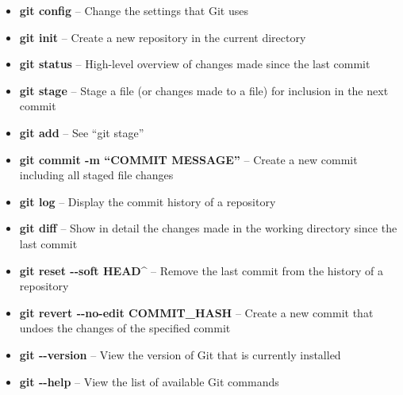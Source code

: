 \documentclass[9pt]{extarticle}
\def\itempad{-1pt}
\begin{document}
\begin{navybox}[title=Git Command Cheat Sheet]
  \begin{itemize}
    \itemsep\itempad
  \item \textbf{git config} -- Change the settings that Git uses
  \item \textbf{git init} -- Create a new repository in the current directory
  \item \textbf{git status} -- High-level overview of changes made since the last
    commit
  \item \textbf{git stage} -- Stage a file (or changes made to a file) for
    inclusion in the next commit
  \item \textbf{git add} -- See ``git stage''
  \item \textbf{git commit -m ``COMMIT MESSAGE''} -- Create a new commit
    including all staged file changes
  \item \textbf{git log} -- Display the commit history of a repository
  \item \textbf{git diff} -- Show in detail the changes made in the working
    directory since the last commit
  \item \textbf{git reset -{}-soft HEAD\^} -- Remove the last commit from the
    history of a repository
  \item \textbf{git revert -{}-no-edit COMMIT\_HASH} -- Create a new commit that
    undoes the changes of the specified commit
  \item \textbf{git -{}-version} -- View the version of Git that is currently
    installed
  \item \textbf{git -{}-help} -- View the list of available Git commands

  \end{itemize}
\end{navybox}


\furtherhelp
\end{document}
